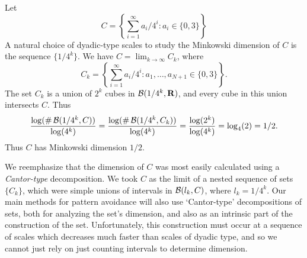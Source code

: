 \begin{example}
	Let
	\[ C = \left\{ \sum_{i = 1}^\infty a_i/4^i : a_i \in \{ 0, 3 \} \right\} \]
	A natural choice of dyadic-type scales to study the Minkowski dimension of $C$ is the sequence $\{ 1/4^k \}$. We have $C = \lim_{k \to \infty} C_k$, where
	\[ C_k = \left\{ \sum_{i = 1}^\infty a_i/4^i : a_1, \dots, a_{N+1} \in \{ 0, 3 \} \right\}. \]
	The set $C_k$ is a union of $2^k$ cubes in $\operatorname{\mathcal{B}}(1/4^k,\operatorname{\mathbf{R}})$, and every cube in this union intersects $C$. Thus
	\[ \frac{\log(\# \operatorname{\mathcal{B}}(1/4^k,C))}{\log(4^k)} = \frac{\log(\# \operatorname{\mathcal{B}}(1/4^k,C_k))}{\log(4^k)} = \frac{\log(2^k)}{\log(4^k)} = \log_4(2) = 1/2. \]
	Thus $C$ has Minkowski dimension $1/2$.
\end{example}

We reemphasize that the dimension of $C$ was most easily calculated using a \emph{Cantor-type} decomposition. We took $C$ as the limit of a nested sequence of sets $\{ C_k \}$, which were simple unions of intervals in $\operatorname{\mathcal{B}}(l_k,C)$, where $l_k = 1/4^k$. Our main methods for pattern avoidance will also use `Cantor-type' decompositions of sets, both for analyzing the set's dimension, and also as an intrinsic part of the construction of the set. Unfortunately, this construction must occur at a sequence of scales which decreases much faster than scales of dyadic type, and so we cannot just rely on just counting intervals to determine dimension.


